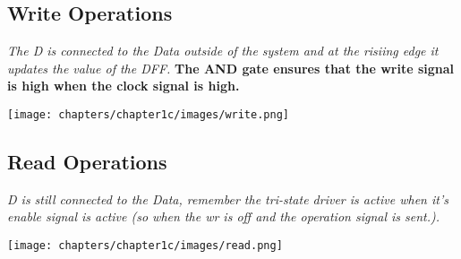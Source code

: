\vfill
\begin{minipage}[htp]{0.45\textwidth}
    \subsection{Write Operations}
    \textit{The D is connected to the Data outside of the system and at the risiing edge it updates the value of the DFF.} \textbf{The AND gate ensures that the write signal is high when the clock signal is high.} \\ \vspace*{5px}
    \begin{center}
        \texttt{[image: chapters/chapter1c/images/write.png]}
    \end{center}
\end{minipage}
\hfill
\vline
\hfill
\begin{minipage}[htp]{0.45\textwidth}
    \subsection{Read Operations}
    \textit{D is still connected to the Data, remember the tri-state driver is active when it's enable signal is active (so when the wr is off and the operation signal is sent.).} \\ \vspace*{5px}
    \begin{center}
        \texttt{[image: chapters/chapter1c/images/read.png]}
    \end{center}
\end{minipage}

\vspace*{5px}
